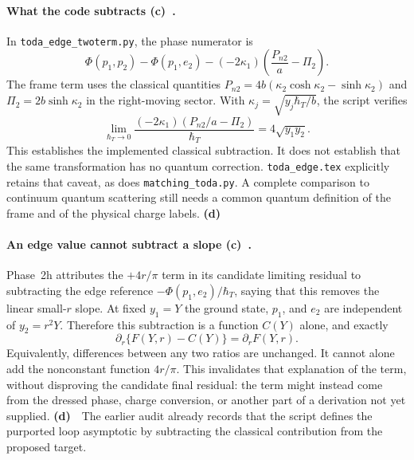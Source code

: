 \documentclass[11pt,a4paper]{article}
\newcommand{\Lc}{\textsf{\textbf{(c)}}\ }
\newcommand{\Ld}{\textsf{\textbf{(d)}}\ }
\begin{document}
\paragraph{What the code subtracts \Lc.}
In \texttt{toda\_edge\_twoterm.py}, the phase numerator is
\[
 \Phi(p_1,p_2)-\Phi(p_1,e_2)
 -(-2\kappa_1)\left(\frac{P_{n2}}a-\Pi_2\right).
\]
The frame term uses the classical quantities
$P_{n2}=4b(\kappa_2\cosh\kappa_2-\sinh\kappa_2)$ and
$\Pi_2=2b\sinh\kappa_2$ in the right-moving sector. With
$\kappa_j=\sqrt{y_j\hbar_T/b}$, the script verifies
\[
 \lim_{\hbar_T\to0}
 \frac{(-2\kappa_1)(P_{n2}/a-\Pi_2)}{\hbar_T}
 =4\sqrt{y_1y_2}.
\]
This establishes the implemented classical subtraction. It does not
establish that the same transformation has no quantum correction.
\texttt{toda\_edge.tex} explicitly retains that caveat, as does
\texttt{matching\_toda.py}. A complete comparison to continuum quantum
scattering still needs a common quantum definition of the frame and of
the physical charge labels. \Ld

\paragraph{An edge value cannot subtract a slope \Lc.}
Phase~2h attributes the $+4r/\pi$ term in its candidate limiting residual
to subtracting the edge reference $-\Phi(p_1,e_2)/\hbar_T$, saying that
this removes the linear small-$r$ slope. At fixed $y_1=Y$ the ground
state, $p_1$, and $e_2$ are independent of $y_2=r^2Y$. Therefore this
subtraction is a function $C(Y)$ alone, and exactly
\[
 \partial_r\{F(Y,r)-C(Y)\}=\partial_r F(Y,r).
\]
Equivalently, differences between any two ratios are unchanged. It cannot
alone add the nonconstant function $4r/\pi$. This invalidates that
explanation of the term, without disproving the candidate final residual:
the term might instead come from the dressed phase, charge conversion,
or another part of a derivation not yet supplied. \Ld\ The earlier audit
already records that the script defines the purported loop asymptotic
by subtracting the classical contribution from the proposed target.
\end{document}
